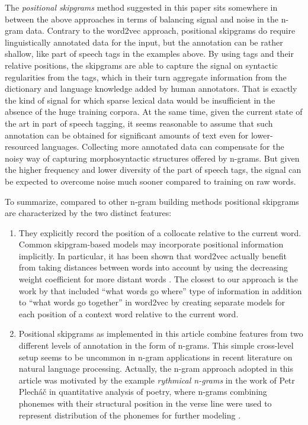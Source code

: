 \documentclass[12pt]{article}
\begin{document}
The \textit{positional skipgrams} method suggested in this paper sits
somewhere in between the above approaches in terms of balancing signal
and noise in the n-gram data. Contrary to the word2vec approach,
positional skipgrams do require linguistically annotated data for the
input, but the annotation can be rather shallow, like part of speech
tags in the examples above.  By using tags and their relative
positions, the skipgrams are able to capture the signal on syntactic
regularities from the tags, which in their turn aggregate information
from the dictionary and language knowledge added by human annotators. That
is exactly the kind of signal for which sparse lexical data would be
insufficient in the absence of the huge training corpora. At the same
time, given the current state of the art in part of speech tagging, it
seems reasonable to assume that such annotation can be obtained for
significant amounts of text even for lower-resourced
languages. Collecting more annotated data can compensate for the noisy
way of capturing morphosyntactic structures offered by n-grams. But
given the higher frequency and lower diversity of the part of speech tags,
the signal can be expected to overcome noise much sooner compared to
training on raw words.

To summarize, compared to other n-gram building methods positional
skipgrams are characterized by the two distinct features:

\begin{enumerate}
\item They explicitly record the position of a collocate relative to
  the current word. Common skipgram-based models may incorporate
  positional information implicitly. In particular, it has been shown
  that word2vec actually benefit from taking distances between words
  into account by using the decreasing weight coefficient for more
  distant words \autocite{levy-etal-2015-improving}. The closest to
  our approach is the work by \textcite{ling-etal-2015-two} that included
  “what words go where” type of information in addition to “what words
  go together” in word2vec by creating separate models for each
  position of a context word relative to the current
  word.
\item Positional skipgrams as implemented in this article combine
  features from two different levels of annotation in the form of
  n-grams. This simple cross-level setup seems to be uncommon in
  n-gram applications in recent literature on natural language
  processing. Actually, the n-gram approach adopted in this article
  was motivated by the example \textit{rythmical n-grams} in the work
  of Petr Plech\'a\v{c} in quantitative analysis of poetry, where
  n-grams combining phonemes with their structural position in the
  verse line were used to represent distribution of the phonemes for
  further modeling \autocite[38]{plechac2019}.
\end{enumerate}
\end{document}
